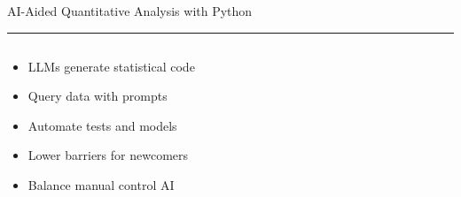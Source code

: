 \documentclass[aspectratio=169]{beamer}
\newcommand{\TitleFont}{\rmfamily}
\begin{document}
\begin{frame}[t]{}
  \vspace*{0.5cm}
  {\TitleFont\fontsize{18}{22}\selectfont\color{LUBronze}AI-Aided Quantitative Analysis with Python\par}
  \vspace{0.3em}
  {\color{LUBronze}\rule{\linewidth}{0.8pt}}\par
  \vspace{0.2cm}
  \begin{columns}[t]
    \begin{column}[t]{0.4\textwidth}
      \vspace*{0pt}
      \begin{itemize}\setlength\itemsep{0.65em}
        \item LLMs generate statistical code
        \item Query data with prompts
        \item Automate tests and models
        \item Lower barriers for newcomers
        \item Balance manual control AI
      \end{itemize}
    \end{column}
  \end{columns}
\end{frame}
\end{document}
